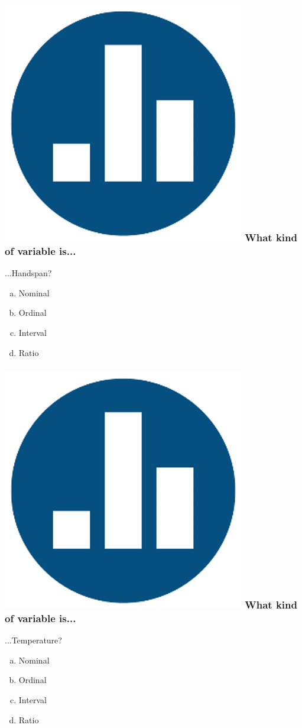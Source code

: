 \begin{frame}
\frametitle{\includegraphics[scale = 0.05]{./images/clicker} \hfill What kind of variable is...}
...Handspan?
	\begin{enumerate}[(a)]
\item Nominal
\item Ordinal
\item Interval
\item Ratio
\end{enumerate}
\end{frame}

\begin{frame}
\frametitle{\includegraphics[scale = 0.05]{./images/clicker} \hfill What kind of variable is...}
...Temperature?
	\begin{enumerate}[(a)]
\item Nominal
\item Ordinal
\item Interval
\item Ratio
\end{enumerate}
\end{frame}

